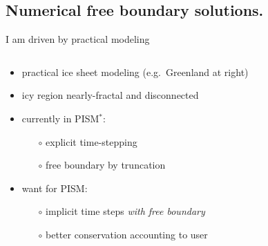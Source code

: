 \documentclass{beamer}
\begin{document}
\subsection{Numerical free boundary solutions.}

\begin{frame}{I am driven by practical modeling}

\begin{columns}
\begin{column}{0.5\textwidth}
\begin{itemize}
\small
\item practical ice sheet modeling (e.g.~Greenland at right)
\item icy region nearly-fractal and disconnected
\item currently in PISM$^*$:
  \begin{itemize}
  \item[$\circ$] explicit time-stepping
  \item[$\circ$] free boundary by truncation
  \end{itemize}
\item want for PISM:
  \begin{itemize}
  \item[$\circ$] implicit time steps \emph{with free boundary}
  \item[$\circ$] better conservation accounting to user
  \end{itemize}
\end{itemize}


\end{column}
\end{columns}
\end{frame}
\end{document}
